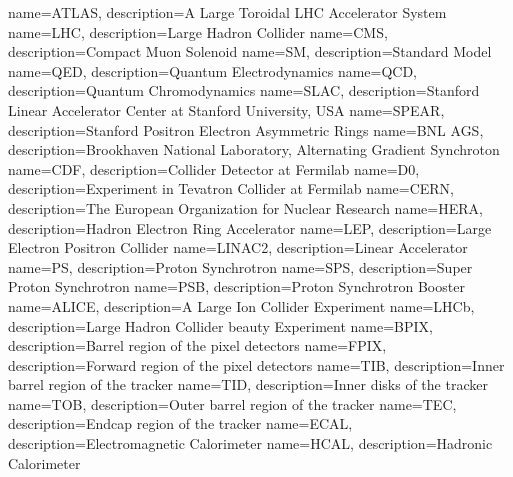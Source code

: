  {name=ATLAS, description={A Large Toroidal LHC Accelerator System}}
   {name=LHC,   description={Large Hadron Collider}}
   {name=CMS,   description={Compact Muon Solenoid}}
   {name=SM,     description={Standard Model}}
   {name=QED,   description={Quantum Electrodynamics}}
   {name=QCD,   description={Quantum Chromodynamics}}
   {name=SLAC, description={Stanford Linear Accelerator Center at Stanford University, USA}}
   {name=SPEAR,   description={Stanford Positron Electron Asymmetric Rings}}
   {name=BNL AGS,   description={Brookhaven National Laboratory, Alternating Gradient Synchroton}}
   {name=CDF,   description={Collider Detector at Fermilab}}
   {name=D0,   description={Experiment in Tevatron Collider at Fermilab}}
   {name=CERN,   description={The European Organization for Nuclear Research}}
   {name=HERA,   description={Hadron Electron Ring Accelerator}}
   {name=LEP,   description={Large Electron Positron Collider}}
   {name=LINAC2,   description={Linear Accelerator}}
   {name=PS,   description={Proton Synchrotron}}
   {name=SPS,   description={Super Proton Synchrotron}}
   {name=PSB,   description={Proton Synchrotron Booster}}
   {name=ALICE,   description={A Large Ion Collider Experiment}}
   {name=LHCb,   description={Large Hadron Collider beauty Experiment}}
   {name=BPIX,   description={Barrel region of the pixel detectors}}
   {name=FPIX,   description={Forward region of the pixel detectors}}
   {name=TIB,   description={Inner barrel region of the tracker}}
   {name=TID,   description={Inner disks of the tracker}}
   {name=TOB,   description={Outer barrel region of the tracker}}
   {name=TEC,   description={Endcap region of the tracker}}
   {name=ECAL,   description={Electromagnetic Calorimeter}}
   {name=HCAL,   description={Hadronic Calorimeter}}
